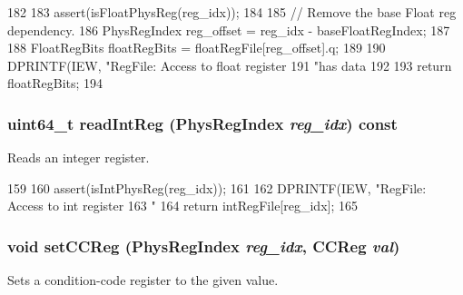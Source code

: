 \begin{DoxyCode}
182     {
183         assert(isFloatPhysReg(reg_idx));
184 
185         // Remove the base Float reg dependency.
186         PhysRegIndex reg_offset = reg_idx - baseFloatRegIndex;
187 
188         FloatRegBits floatRegBits = floatRegFile[reg_offset].q;
189 
190         DPRINTF(IEW, "RegFile: Access to float register %
191                 "has data %
192 
193         return floatRegBits;
194     }
\end{DoxyCode}
\hypertarget{classPhysRegFile_a5eb773a9b4b73e9e51ba3b155cf881f7}{
\subsubsection[{readIntReg}]{\setlength{\rightskip}{0pt plus 5cm}uint64\_\-t readIntReg ({\bf PhysRegIndex} {\em reg\_\-idx}) const}}
\label{classPhysRegFile_a5eb773a9b4b73e9e51ba3b155cf881f7}
Reads an integer register. 


\begin{DoxyCode}
159     {
160         assert(isIntPhysReg(reg_idx));
161 
162         DPRINTF(IEW, "RegFile: Access to int register %
163                 "%
164         return intRegFile[reg_idx];
165     }
\end{DoxyCode}
\hypertarget{classPhysRegFile_a69574b9ed272ea564594bcb8986c6b1d}{
\subsubsection[{setCCReg}]{\setlength{\rightskip}{0pt plus 5cm}void setCCReg ({\bf PhysRegIndex} {\em reg\_\-idx}, \/  {\bf CCReg} {\em val})}}
\label{classPhysRegFile_a69574b9ed272ea564594bcb8986c6b1d}
Sets a condition-\/code register to the given value. 


